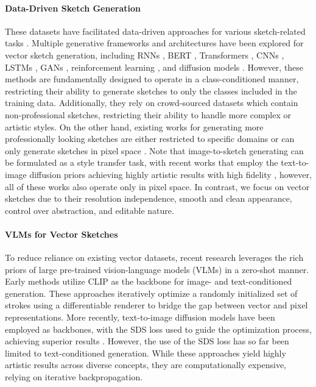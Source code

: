 \paragraph{\textbf{Data-Driven Sketch Generation}}
These datasets have facilitated data-driven approaches for various sketch-related tasks \cite{SurveySketchxu2020deep}. Multiple generative frameworks and architectures have been explored for vector sketch generation, including RNNs \cite{SketchRNN}, BERT \cite{Lin2020SketchBERTLS}, Transformers \cite{Bhunia2020EdinburghRE, Ribeiro2020SketchformerTR}, CNNs \cite{Kampelmhler2020SynthesizingHS,Chen2017Sketchpix2seqAM,Song2018LearningTS}, LSTMs \cite{Qi2021SketchLatticeLR, Song2018LearningTS}, GANs \cite{V2019TeachingGT}, reinforcement learning \cite{Zhou2018LearningTD,Muhammad2018LearningDS}, and diffusion models \cite{wang2023sketchknitter}. However, these methods are fundamentally designed to operate in a class-conditioned manner, restricting their ability to generate sketches to only the classes included in the training data. Additionally, they rely on crowd-sourced datasets which contain non-professional sketches, restricting their ability to handle more complex or artistic styles.
On the other hand, existing works for generating more professionally looking sketches are either restricted to specific domains \cite{Liu_2021_ICCV} or can only generate sketches in pixel space \cite{Li2019PhotoSketchingIC,Chan2022LearningTG}.
Note that image-to-sketch generating can be formulated as a style transfer task, with recent works that employ the text-to-image diffusion priors achieving highly artistic results with high fidelity \cite{Wang2024InstantStyleFL,frenkel2024implicit,hertz2023StyleAligned}, however, all of these works also operate only in pixel space.
In contrast, we focus on vector sketches due to their resolution independence, smooth and clean appearance, control over abstraction, and editable nature.



\paragraph{\textbf{VLMs for Vector Sketches}}
To reduce reliance on existing vector datasets, recent research leverages the rich priors of large pre-trained vision-language models (VLMs) in a zero-shot manner. Early methods \cite{vinker2022clipasso,Frans2021CLIPDrawET,Vinker2022CLIPasceneSS} utilize CLIP \cite{Radfordclip} as the backbone for image- and text-conditioned generation. These approaches iteratively optimize a randomly initialized set of strokes using a differentiable renderer \cite{Li2020DifferentiableVG} to bridge the gap between vector and pixel representations. More recently, text-to-image diffusion models \cite{rombach2022highresolution} have been employed as backbones, with the SDS loss \cite{Poole2022DreamFusionTU} used to guide the optimization process, achieving superior results \cite{jain2022vectorfusion,svgdreamer_xing_2023,Xing2023DiffSketcherTG}. However, the use of the SDS loss has so far been limited to text-conditioned generation.
While these approaches yield highly artistic results across diverse concepts, they are computationally expensive, relying on iterative backpropagation.


